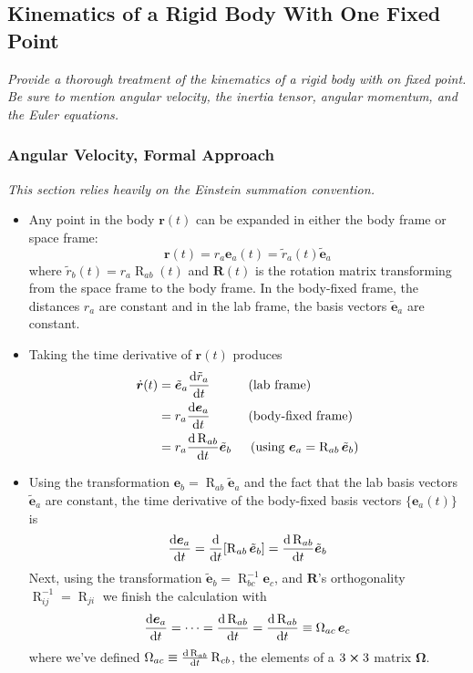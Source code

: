 \documentclass[11pt, a4paper]{article}
\newcommand{\e}{\bm{e}} %
\newcommand{\mat}[1]{\mathbf{#1}}
\begin{document}
\subsection{Kinematics of a Rigid Body With One Fixed Point}
\textit{Provide a thorough treatment of the kinematics of a rigid body with on fixed point. Be sure to mention angular velocity, the inertia tensor, angular momentum, and the Euler equations.}

\subsubsection{Angular Velocity, Formal Approach}
\textit{This section relies heavily on the Einstein summation convention.}
\begin{itemize}
	\item Any point in the body $ \bm{r}(t) $ can be expanded in either the body frame or space frame:
	\begin{equation*}
		\bm{r}(t) = r_{a} \e_{a}(t) = \tilde{r}_{a}(t) \tilde{\e}_{a}
	\end{equation*}
	where $ \tilde{r}_{b}(t) = r_{a}\operatorname{R}_{ab}(t)$ and $ \mat{R}(t) $ is the rotation matrix transforming from the space frame to the body frame. In the body-fixed frame, the distances $ r_{a} $ are constant and in the lab frame, the basis vectors $ \tilde{\e}_{a} $ are constant. 
	
	\item Taking the time derivative of $ \bm{r}(t) $ produces
	\begin{align*}
		\dot{\bm{r}}(t) &=  \tilde{\e}_{a} \dv{\tilde{r}_{a}}{t} \quad \qquad \text{(lab frame)}\\
		&= r_{a} \dv{\e_{a}}{t} \quad \qquad \text{(body-fixed frame)} \\
		&=  r_{a}  \dv{\operatorname{R}_{ab}}{t} \tilde{\e}_{b} \quad \ \left(\text{using }  \e_{a} = \operatorname{R}_{ab}\tilde{\e}_{b}\right)
	\end{align*}

	\item Using the transformation $ \e_{b} = \operatorname{R}_{ab}\tilde{\e}_{a} $ and the fact that the lab basis vectors $ \tilde{\e}_{a} $ are constant, the time derivative of the body-fixed basis vectors $ \{\e_{a}(t) \} $ is
	\begin{equation*}
		\dv{\e_{a}}{t} = \dv{}{t}[\operatorname{R}_{ab} \tilde{\e}_{b}] = \dv{\operatorname{R}_{ab}}{t} \tilde{\e}_{b} 
	\end{equation*}
	Next, using the transformation $ \tilde{\e}_{b} = \operatorname{R}^{-1}_{bc}\e_{c} $,  and $ \mat{R} $'s orthogonality $ \operatorname{R}_{ij}^{-1}= \operatorname{R}_{ji} $ we finish the calculation with
	\begin{equation*}
		\dv{\e_{a}}{t} = \cdots =  \dv{\operatorname{R}_{ab}}{t} (\operatorname{R}^{-1}_{bc} \e_{c}) = \dv{\operatorname{R}_{ab}}{t} (\operatorname{R}_{cb} \e_{c}) \equiv \operatorname{\Omega}_{ac} \e_{c}
	\end{equation*}
	where we've defined $ \operatorname{\Omega}_{ac}\equiv \dv{\operatorname{R}_{ab}}{t} \operatorname{R}_{cb}$, the elements of a $ 3 \cross 3 $ matrix $ \mat{\Omega} $.
	

\end{itemize}
\end{document}
